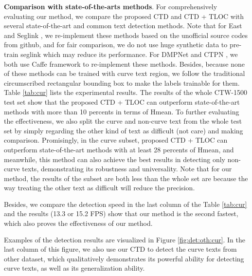 \documentclass[10pt,twocolumn,letterpaper]{article}
\begin{document}
{\bf{Comparison with state-of-the-arts methods}}. For comprehensively evaluating our method, we compare the proposed CTD and CTD + TLOC with several state-of-the-art and common text detection methods. Note that for East \cite{zhou2017east} and Seglink \cite{shi2017detecting}, we re-implement these methods based on the unofficial source codes from github, and for fair comparison, we do not use huge synthetic data to pre-train seglink which may reduce its performance. For DMPNet \cite{liu2017deep} and CTPN \cite{tian2016detecting}, we both use Caffe \cite{jia2014caffe} framework to re-implement these methods. Besides, because none of these methods can be trained with curve text region, we follow the traditional circumscribed rectangular bounding box to make the labels trainable for them. Table \ref{tab:cur} lists the experimental results. The results of the whole CTW-1500 test set show that the proposed CTD + TLOC can outperform state-of-the-art methods with more than 10 percents in terms of Hmean. To further evaluating the effectiveness, we also split the curve and non-curve text from the whole test set by simply regarding the other kind of text as difficult (not care) and making comparison. Promisingly, in the curve subset, proposed CTD + TLOC can outperform state-of-the-art methods with at least 28 percents of Hmean, and meanwhile, this method can also achieve the best results in detecting only non-curve texts, demonstrating its robustness and universality. Note that for our method, the results of the subset are both less than the whole set are because the way treating the other text as difficult will reduce the precision.

Besides, we compare the detection speed in the last column of the Table \ref{tab:cur} and the results (13.3 or 15.2 FPS) show that our method is the second fastest, which also proves the effectiveness of our method.  

Examples of the detection results are visualized in Figure \ref{fig:det:oth:cur}. In the last column of this figure, we also use our CTD to detect the curve texts from other dataset, which qualitatively demonstrates its powerful ability for detecting curve texts, as well as its generalization ability.
\end{document}
